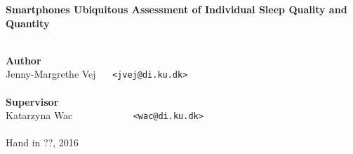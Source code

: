 \documentclass[a4paper,oneside]{memoir}
\begin{document}
    \thispagestyle{empty}
    \begin{adjustwidth}{-3cm}{-1.5cm}
    \vspace*{3.5cm}
    \textbf{\huge Smartphones Ubiquitous Assessment of Individual Sleep Quality and Quantity} \\
    \vspace*{.1cm} \\
    \begin{tabbing}
    \textbf{\Large Author} \\
    Jenny-Margrethe Vej ~~ \= \texttt{<jvej@di.ku.dk>} \\
    \vspace*{.1cm} \\
    \textbf{\Large Supervisor} \\
    Katarzyna Wac ~~~~~~~~~~~ \= \texttt{<wac@di.ku.dk>} \\
    \vspace*{.1cm} \\
    Hand in ??, 2016
    \\[11.7cm]
    \end{tabbing}
    \end{adjustwidth}
    \ClearWallPaper
\end{document}
